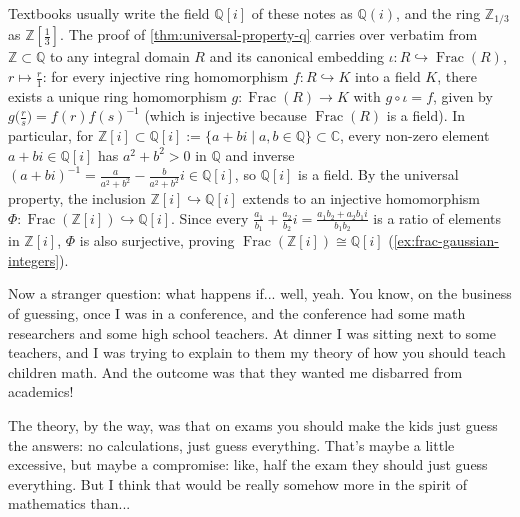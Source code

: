 \begin{aiNote}
Textbooks usually write the field $\mathbb{Q}[i]$ of these notes as $\mathbb{Q}(i)$, and the ring $\mathbb{Z}_{1/3}$ as $\mathbb{Z}[\frac{1}{3}]$. The proof of \cref{thm:universal-property-q} carries over verbatim from $\mathbb{Z} \subset \mathbb{Q}$ to any integral domain $R$ and its canonical embedding $\iota \colon R \hookrightarrow \operatorname{Frac}(R)$, $r \mapsto \frac{r}{1}$: for every injective ring homomorphism $f \colon R \hookrightarrow K$ into a field $K$, there exists a unique ring homomorphism $g \colon \operatorname{Frac}(R) \to K$ with $g \circ \iota = f$, given by $g\bigl(\frac{r}{s}\bigr) = f(r) f(s)^{-1}$ (which is injective because $\operatorname{Frac}(R)$ is a field). In particular, for $\mathbb{Z}[i] \subset \mathbb{Q}[i] := \{a + bi \mid a, b \in \mathbb{Q}\} \subset \mathbb{C}$, every non-zero element $a + bi \in \mathbb{Q}[i]$ has $a^2 + b^2 > 0$ in $\mathbb{Q}$ and inverse $(a + bi)^{-1} = \frac{a}{a^2+b^2} - \frac{b}{a^2+b^2}i \in \mathbb{Q}[i]$, so $\mathbb{Q}[i]$ is a field. By the universal property, the inclusion $\mathbb{Z}[i] \hookrightarrow \mathbb{Q}[i]$ extends to an injective homomorphism $\Phi \colon \operatorname{Frac}(\mathbb{Z}[i]) \hookrightarrow \mathbb{Q}[i]$. Since every $\frac{a_1}{b_1} + \frac{a_2}{b_2}i = \frac{a_1 b_2 + a_2 b_1 i}{b_1 b_2}$ is a ratio of elements in $\mathbb{Z}[i]$, $\Phi$ is also surjective, proving $\operatorname{Frac}(\mathbb{Z}[i]) \cong \mathbb{Q}[i]$ (\cref{ex:frac-gaussian-integers}).
\end{aiNote}

\begin{speech}[01:13:22 - 01:14:49]
Now a stranger question: what happens if... well, yeah.
You know, on the business of guessing, once I was in a conference, and the conference had some math researchers and some high school teachers. At dinner I was sitting next to some teachers, and I was trying to explain to them my theory of how you should teach children math. And the outcome was that they wanted me disbarred from academics! 

The theory, by the way, was that on exams you should make the kids just guess the answers: no calculations, just guess everything. That's maybe a little excessive, but maybe a compromise: like, half the exam they should just guess everything. But I think that would be really somehow more in the spirit of mathematics than...
\end{speech}

